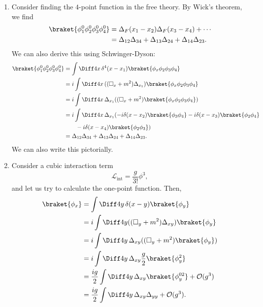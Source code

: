 \documentclass[12pt]{article}
\begin{document}
\begin{exbox}
	\begin{enumerate}
		\item Consider finding the $4$-point function in the free theory. By Wick's theorem, we find
			\begin{align*}
				\braket{\phi_1^0 \phi_2^0 \phi_3^0 \phi_4^0} &= \Delta_F(x_1 - x_2) \Delta_F(x_3 - x_4) + \cdots \\
									     &= \Delta_{12} \Delta_{34} + \Delta_{13} \Delta_{24} + \Delta_{14} \Delta_{23}.
			\end{align*}
			We can also derive this using Schwinger-Dyson:
			\begin{align*}
				\braket{\phi_1^0 \phi_2^0 \phi_3^0 \phi_4^0} &= \int \Diff 4 x \, \delta^{4}(x - x_1) \braket{\phi_x \phi_2 \phi_3 \phi_4 } \\
									     &= i \int \Diff 4 x \, ((\square_x + m^2) \Delta_{x_1}) \braket{\phi_x \phi_2 \phi_3 \phi_4} \\
									     &= i \int \Diff4 x \, \Delta_{x_1}((\square_x + m^2) \braket{\phi_x \phi_2 \phi_3 \phi_4}) \\
									     &= i \int \Diff 4 x \, \Delta_{x_1}(-i \delta(x - x_2) \braket{\phi_3\phi_4} - i \delta(x - x_3) \braket{\phi_2\phi_4} \\
									     & \qquad - i \delta(x - x_4) \braket{\phi_2 \phi_3}) \\
									     &= \Delta_{12} \Delta_{34} + \Delta_{13} \Delta_{24} + \Delta_{14} \Delta_{23}.
			\end{align*}
			We can also write this pictorially.
		\item Consider a cubic interaction term
			\[
			\mathcal{L}_{\mathrm{int}} = \frac{g}{3!} \phi^3,
			\]
			and let us try to calculate the one-point function. Then,
			\begin{align*}
				\braket{\phi_x} &= \int \Diff 4 y \, \delta(x - y) \braket{\phi_y} \\
						&= i \int \Diff 4 y ((\square_y + m^2) \Delta_{xy}) \braket{\phi_y} \\
						&= i \int \Diff 4 y \, \Delta_{xy}((\square_y + m^2) \braket{\phi_y}) \\
						&= i \int \Diff 4 y \, \Delta_{xy} \frac{g}{2} \braket{\phi_y^2} \\
						&= \frac{ig}{2} \int \Diff 4 y \, \Delta_{xy} \braket{\phi_y^{02}} + \mathcal{O}(g^3) \\
						&= \frac{ig}{2} \int \Diff 4 y \, \Delta_{xy} \Delta_{yy} + \mathcal{O}(g^3).

\end{align*}
\end{enumerate}
\end{exbox}
\end{document}
